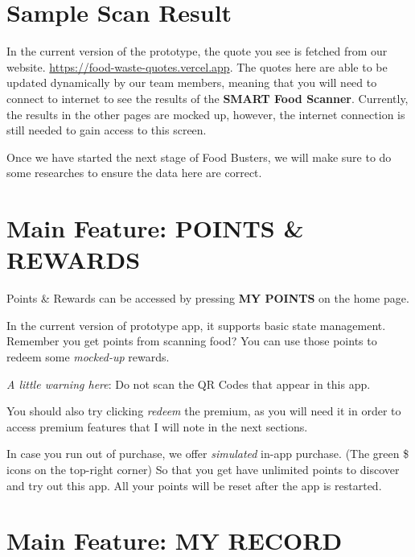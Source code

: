 \documentclass[a4paper,12pt]{article}
\begin{document}
\pagebreak
\section*{Sample Scan Result}


In the current version of the prototype, the quote you see is fetched from our website.
\href{https://food-waste-quotes.vercel.app}{https://food-waste-quotes.vercel.app}.
The quotes here are able to be updated dynamically by our team members,
meaning that you will need to connect to internet to see the results of
the \textbf{SMART Food Scanner}. Currently, the results in the other pages are mocked up,
however, the internet connection is still needed to gain access to this screen.

Once we have started the next stage of Food Busters, we will make sure to do
some researches to ensure the data here are correct.

\pagebreak
\section{Main Feature: POINTS \& REWARDS}

Points \& Rewards can be accessed by pressing \textbf{MY POINTS} on the home page.


In the current version of prototype app, it supports basic state management.
Remember you get points from scanning food? You can use those points to redeem
some \textit{mocked-up} rewards.

\textit{A little warning here}: Do not scan the QR Codes that appear in this app.

You should also try clicking \textit{redeem} the premium, as you will need it
in order to access premium features that I will note in the next sections.

In case you run out of purchase, we offer \textit{simulated} in-app purchase.
(The green \$ icons on the top-right corner) So that you get have unlimited points
to discover and try out this app. All your points will be reset after the app is restarted.

\pagebreak
\section{Main Feature: MY RECORD}
\end{document}
